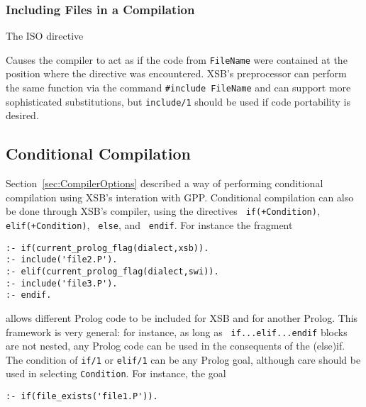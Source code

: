 \subsubsection{Including Files in a Compilation}

\begin{description}


The ISO directive 


\noindent

Causes the compiler to act as if the code from {\tt FileName} were
contained at the position where the directive was encountered.  XSB's
preprocessor can perform the same function via the command
\verb|#include FileName| and can support more sophisticated
substitutions, but {\tt include/1} should be used if code portability
is desired.

\end{description}

\subsection{Conditional Compilation}
%
Section~\ref{sec:CompilerOptions} described a way of performing
conditional compilation using XSB's interation with GPP.  Conditional
compilation can also be done through XSB's compiler, using the
directives {\tt \mif{} if(+Condition)}, {\tt \mif{}
  elif(+Condition)}, {\tt \mif{} else}, and {\tt \mif{} endif}.  For
instance the fragment

\begin{verbatim}
:- if(current_prolog_flag(dialect,xsb)).
:- include('file2.P').
:- elif(current_prolog_flag(dialect,swi)).
:- include('file3.P').
:- endif.
\end{verbatim}

allows different Prolog code to be included for XSB and for another
Prolog.  This framework is very general: for instance, as long as {\tt
  if...elif...endif} blocks are not nested, any Prolog code can be
used in the consequents of the (else)if.  The condition of {\tt if/1}
or {\tt elif/1} can be any Prolog goal, although care should be used
in selecting {\tt Condition}.  For instance, the goal

\begin{verbatim}
:- if(file_exists('file1.P')).
\end{verbatim}

